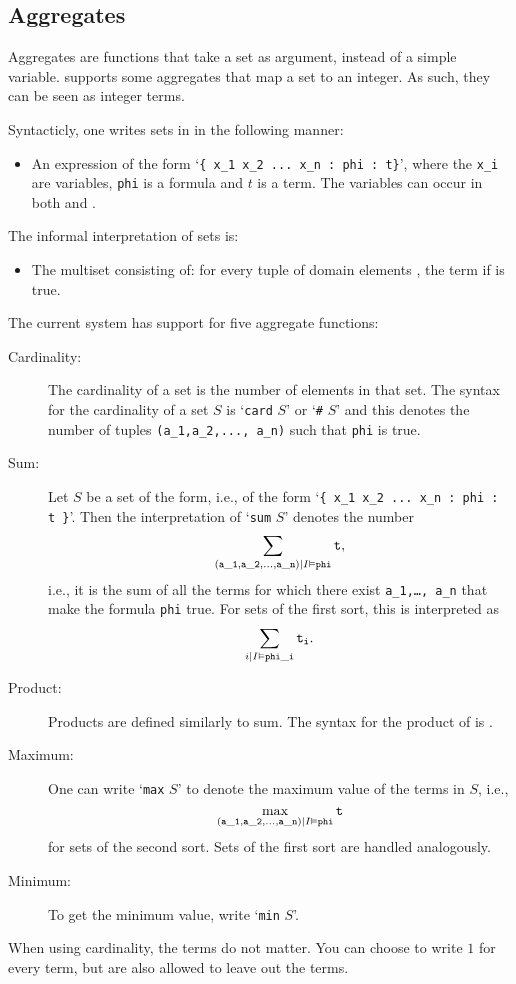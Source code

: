 \subsection{Aggregates}
Aggregates are functions that take a set as argument, instead of a simple variable. \idp supports some aggregates that map a set to an integer. As such, they can be seen as integer terms.

Syntacticly, one writes sets in \idp in the following manner:
\begin{itemize}
	\item An expression of the form `{\tt \{ x\_1 x\_2 ... x\_n : phi : t\}}', where the {\tt x\_i} are variables, {\tt phi} is a formula and $t$ is a term. The variables  can occur in both  and . %
\end{itemize} 
The informal interpretation of sets is:
\begin{itemize}
 \item The multiset consisting of: for every tuple of domain elements ,  the term  if  is true.
\end{itemize}

The current system has support for five aggregate functions:
\begin{description}
	\item[Cardinality:] The cardinality of a set is the number of elements in that set. The \idp syntax for the cardinality of a set $S$ is `{\tt card} $S$' or `{\tt \#} $S$' and this denotes the number of tuples {\tt(a\_1,a\_2,..., a\_n)} such that {\tt phi} is true.
	\item[Sum:] Let $S$ be a set of the form, i.e., of the form `{\tt \{ x\_1 x\_2 ... x\_n : phi : t \}}'. Then the interpretation of `{\tt sum} $S$' denotes the number
	\[ \sum_{{\tt(a\_1,a\_2,..., a\_n)} | I\vDash {\tt phi}} {\tt t }, \]
	i.e., it is the sum of all the terms for which there exist {\tt a\_1,\ldots, a\_n} that make the formula {\tt phi} true. For sets of the first sort, this is interpreted as 
\[ \sum_{i | I\vDash {\tt phi\_i}} {\tt t_i }. \]
	\item[Product:] Products are defined similarly to sum.  The syntax for the product of  is .
	\item[Maximum:] One can write `{\tt max} $S$' to denote the maximum value of the terms in $S$, i.e.,
	\[ \max_{{\tt(a\_1,a\_2,..., a\_n)} | I\vDash {\tt phi}} {\tt t} \] for sets of the second sort.  Sets of the first sort are handled analogously. %
	\item[Minimum:] To get the minimum value, write `{\tt min} $S$'.
\end{description}
When using cardinality, the terms do not matter.  You can choose to write $1$ for every term, but are also allowed to leave out the terms.

